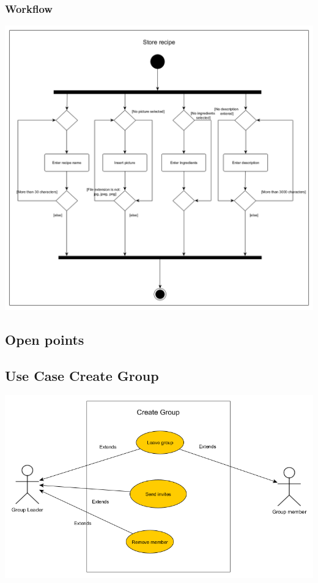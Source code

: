 \documentclass[12pt]{article}
\theoremstyle{definition}
\begin{document}
\subsubsection{Workflow}

\includegraphics[scale=.5]{Images/WorkflowStoreRecipe.png}

\subsection{Open points}


\subsection{Use Case Create Group}

\includegraphics[scale=.5]{Images/UseCaseCreateGroup.png}\\
\end{document}
